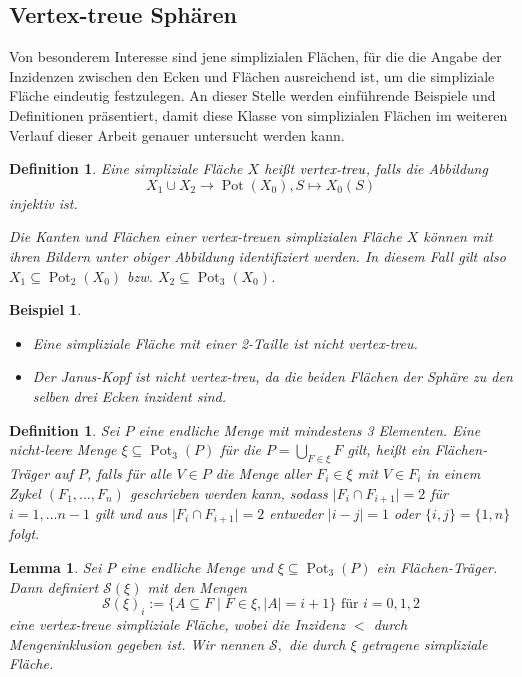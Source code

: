 \documentclass[12pt,titlepage,twoside,cleardoublepage]{article}
\theoremstyle{nummermitklammern}
\newtheorem{lemma}[temp]{Lemma}
\newtheorem{bsp}[temp]{Beispiel}
\newtheorem{definition}[temp]{Definition}
\newtheorem{definition}[zahl]{Definition}
\newtheorem{lemma}[zahl]{Lemma}
\newtheorem{bsp}[zahl]{Beispiel}
\numberwithin{equation}{section}
\DeclareMathOperator{\Pot}{Pot}
\begin{document}
\subsection{Vertex-treue Sphären}
Von besonderem Interesse sind jene simplizialen Flächen, für die die Angabe der Inzidenzen zwischen den Ecken und Flächen ausreichend ist, um die simpliziale Fläche eindeutig festzulegen. An dieser Stelle werden einführende Beispiele und Definitionen präsentiert, damit diese Klasse von simplizialen Flächen im weiteren Verlauf dieser Arbeit genauer untersucht werden kann.
\begin{definition}
Eine simpliziale Fläche $X$ heißt $\emph{vertex-treu}$, falls die Abbildung
\[
X_1 \cup X_2 \to \Pot(X_0),S \mapsto X_0(S)
\]
 injektiv ist. 

Die Kanten und Flächen einer vertex-treuen simplizialen Fläche $X$ können  mit ihren Bildern unter obiger Abbildung identifiziert werden. In diesem Fall gilt also $X_1 \subseteq \Pot_2(X_0)$ bzw. $X_2\subseteq \Pot_3(X_0)$. 
\end{definition}
\begin{bsp}
\begin{itemize}
\item Eine simpliziale Fläche mit einer 2-Taille ist nicht vertex-treu.
\item Der Janus-Kopf ist nicht vertex-treu, da die beiden Flächen der Sphäre  zu den selben drei Ecken inzident sind.
\end{itemize}
\end{bsp}
\begin{definition}
Sei $P$ eine endliche Menge mit mindestens 3 Elementen. Eine nicht-leere Menge $\xi \subseteq \Pot_3(P)$ für die $P=\bigcup_{F\in \xi} F$ gilt, heißt ein \emph{Flächen-Träger} auf $P$, falls für alle $V\in P$ die Menge aller $F_i \in \xi$ mit $V \in F_i$ in einem Zykel  $(F_1,\ldots ,F_n)$ geschrieben werden kann, sodass $\vert F_i \cap F_{i+1}\vert=2 $ für $i=1,\ldots n-1$ gilt und aus $\vert F_i \cap F_{i+1}\vert=2$ entweder $\vert i-j\vert =1$ oder $\{i,j\}=\{1,n\}$ folgt.  
\end{definition}
\begin{lemma}
Sei $P$ eine endliche Menge und $\xi \subseteq \Pot_3(P)$ ein Flächen-Träger. Dann definiert $\mathcal{S}(\xi)$ mit den Mengen 
\[
\mathcal{S}(\xi)_i:=\{A\subseteq F\mid F\in \xi,\vert A\vert=i+1\}\text{ für }i=0,1,2 
\]eine vertex-treue simpliziale Fläche, wobei die Inzidenz $<$ durch Mengeninklusion gegeben ist. Wir nennen $\mathcal{S},$ die durch $\xi$ \emph{getragene} simpliziale Fläche.
\end{lemma}
\end{document}
